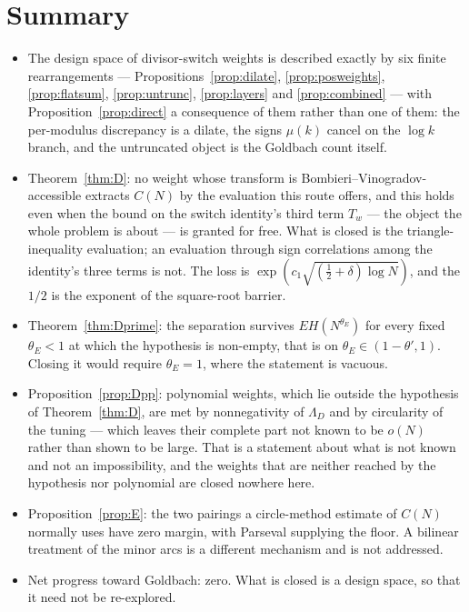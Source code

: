 \documentclass[11pt,a4paper]{article}
\theoremstyle{plain}
\theoremstyle{definition}
\theoremstyle{remark}
\begin{document}
\section{Summary}

\begin{itemize}
\item The design space of divisor-switch weights is described exactly
by six finite rearrangements ---
Propositions~\ref{prop:dilate}, \ref{prop:posweights},
\ref{prop:flatsum}, \ref{prop:untrunc}, \ref{prop:layers} and
\ref{prop:combined} --- with
Proposition~\ref{prop:direct} a consequence of them rather than one of
them: the per-modulus
discrepancy is a dilate, the signs $\mu(k)$ cancel on the $\log k$
branch, and the untruncated object is the Goldbach count itself.

\item Theorem~\ref{thm:D}: no weight whose transform is
Bombieri--Vinogradov-accessible extracts $C(N)$ by the evaluation this
route offers, and this holds even
when the bound on the switch identity's third term $T_w$ --- the object
the whole problem is about --- is granted for free. What is closed is
the triangle-inequality evaluation; an evaluation through sign
correlations among the identity's three terms is not. The loss is
$\exp(c_1\sqrt{(\frac12+\delta)\log N})$, and the $1/2$ is the exponent of the
square-root barrier.

\item Theorem~\ref{thm:Dprime}: the separation survives
$EH(N^{\theta_E})$ for every fixed $\theta_E<1$ at which the
hypothesis is non-empty, that is on $\theta_E\in(1-\theta',1)$.
Closing it would require $\theta_E=1$, where the statement is vacuous.

\item Proposition~\ref{prop:Dpp}: polynomial weights, which lie
outside the hypothesis of Theorem~\ref{thm:D}, are met by
nonnegativity of $\Lambda_D$ and by circularity of the tuning ---
which leaves their complete part not known to be $o(N)$ rather
than shown to be large. That is a statement about what is not
known and not an impossibility, and the weights that are neither
reached by the hypothesis nor polynomial are closed nowhere here.

\item Proposition~\ref{prop:E}: the two pairings a circle-method
estimate of $C(N)$ normally uses have zero margin, with Parseval
supplying the floor. A bilinear treatment of the minor arcs is a
different mechanism and is not addressed.

\item Net progress toward Goldbach: zero. What is closed is a design
space, so that it need not be re-explored.
\end{itemize}
\end{document}
